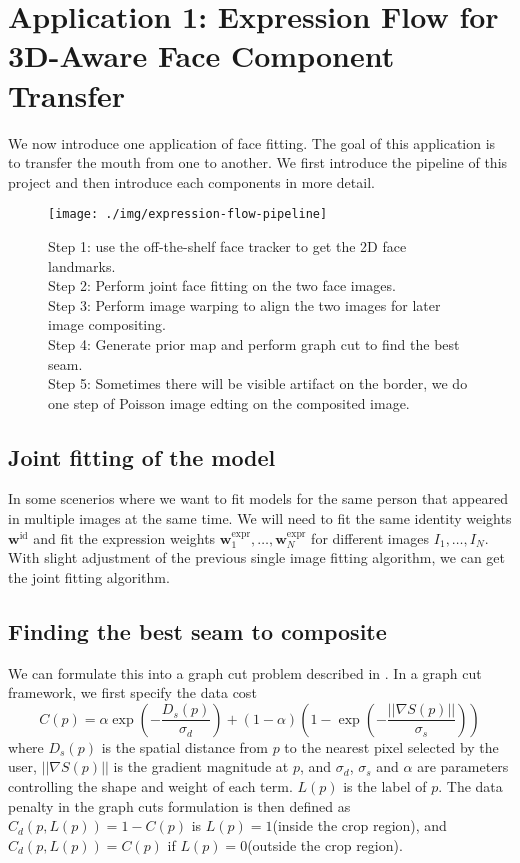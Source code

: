 
\section{Application 1: Expression Flow for 3D-Aware Face
Component Transfer}
We now introduce one application of face fitting. The goal of this application is to transfer the mouth from one to another. We first introduce the pipeline of this project and then introduce each components in more detail.
\begin{figure}[H]
\texttt{[image: ./img/expression-flow-pipeline]}
\caption{Step 1: use the off-the-shelf face tracker to get the 2D face landmarks. \\
Step 2: Perform joint face fitting on the two face images. \\
Step 3: Perform image warping to align the two images for later image compositing. \\
Step 4: Generate prior map and perform graph cut to find the best seam. \\
Step 5: Sometimes there will be visible artifact on the border, we do one step of Poisson image edting on the composited image.}
\end{figure}

\subsection{Joint fitting of the model}
In some scenerios where we want to fit models for the same person that appeared in multiple images at the same time. We will need to fit the same identity weights $\mathbf{w}^{\text{id}}$ and fit the expression weights $\mathbf{w}^{\text{expr}}_1, \dots, \mathbf{w}^{\text{expr}}_N$ for different images $I_1, \dots, I_N$. With slight adjustment of the previous single image fitting algorithm, we can get the joint fitting algorithm.

\subsection{Finding the best seam to composite}
We can formulate this into a graph cut problem described in \cite{agarwala2004interactive}. In a graph cut framework, we first specify the data cost 
$$C(p) = \alpha \exp(-\frac{D_s(p)}{\sigma_d}) + (1 - \alpha) \left(1 - \exp(-\frac{||\nabla S(p)||}{\sigma_s})\right)$$
where $D_s(p)$ is the spatial distance from $p$ to the nearest pixel selected by the user, $||\nabla S(p)||$ is the gradient magnitude at $p$, and $\sigma_d$, $\sigma_s$ and $\alpha$ are parameters controlling the shape and weight of each term. $L(p)$ is the label of $p$. The data penalty in the graph cuts formulation is then defined as $C_d(p, L(p)) = 1 - C(p)$ is $L(p) = 1$(inside the crop region), and $C_d(p, L(p)) = C(p)$ if $L(p) = 0$(outside the crop region). 

